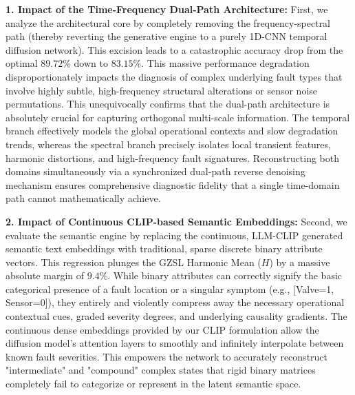 \textbf{1. Impact of the Time-Frequency Dual-Path Architecture:}
First, we analyze the architectural core by completely removing the frequency-spectral path (thereby reverting the generative engine to a purely 1D-CNN temporal diffusion network). This excision leads to a catastrophic accuracy drop from the optimal $89.72\%$ down to $83.15\%$. This massive performance degradation disproportionately impacts the diagnosis of complex underlying fault types that involve highly subtle, high-frequency structural alterations or sensor noise permutations. This unequivocally confirms that the dual-path architecture is absolutely crucial for capturing orthogonal multi-scale information. The temporal branch effectively models the global operational contexts and slow degradation trends, whereas the spectral branch precisely isolates local transient features, harmonic distortions, and high-frequency fault signatures. Reconstructing both domains simultaneously via a synchronized dual-path reverse denoising mechanism ensures comprehensive diagnostic fidelity that a single time-domain path cannot mathematically achieve.

\textbf{2. Impact of Continuous CLIP-based Semantic Embeddings:}
Second, we evaluate the semantic engine by replacing the continuous, LLM-CLIP generated semantic text embeddings with traditional, sparse discrete binary attribute vectors. This regression plunges the GZSL Harmonic Mean ($H$) by a massive absolute margin of $9.4\%$. While binary attributes can correctly signify the basic categorical presence of a fault location or a singular symptom (e.g., [Valve=1, Sensor=0]), they entirely and violently compress away the necessary operational contextual cues, graded severity degrees, and underlying causality gradients. The continuous dense embeddings provided by our CLIP formulation allow the diffusion model's attention layers to smoothly and infinitely interpolate between known fault severities. This empowers the network to accurately reconstruct "intermediate" and "compound" complex states that rigid binary matrices completely fail to categorize or represent in the latent semantic space.

